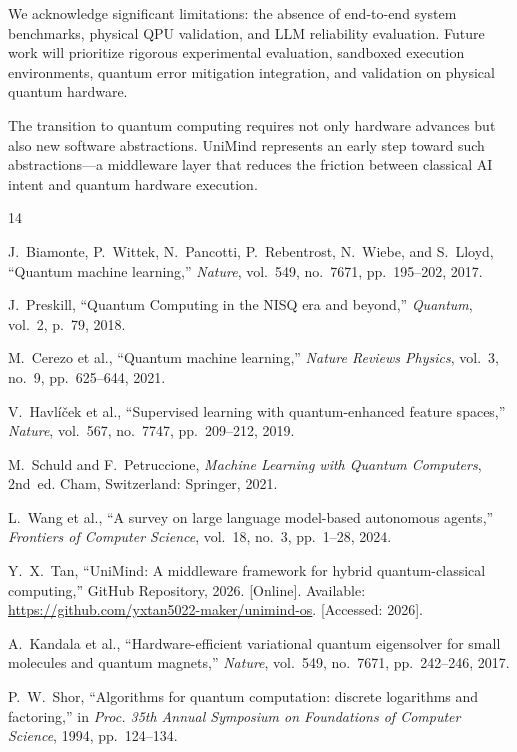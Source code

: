 ﻿\documentclass[12pt,a4paper]{article}
\begin{document}
We acknowledge significant limitations: the absence of end-to-end system benchmarks, physical QPU validation, and LLM reliability evaluation. Future work will prioritize rigorous experimental evaluation, sandboxed execution environments, quantum error mitigation integration, and validation on physical quantum hardware.

The transition to quantum computing requires not only hardware advances but also new software abstractions. UniMind represents an early step toward such abstractions---a middleware layer that reduces the friction between classical AI intent and quantum hardware execution.


\newpage
\begin{thebibliography}{14}

J.~Biamonte, P.~Wittek, N.~Pancotti, P.~Rebentrost, N.~Wiebe, and S.~Lloyd,
``Quantum machine learning,''
\textit{Nature}, vol.~549, no.~7671, pp.~195--202, 2017.

J.~Preskill,
``Quantum Computing in the NISQ era and beyond,''
\textit{Quantum}, vol.~2, p.~79, 2018.

M.~Cerezo et al.,
``Quantum machine learning,''
\textit{Nature Reviews Physics}, vol.~3, no.~9, pp.~625--644, 2021.

V.~Havl\'{i}\v{c}ek et al.,
``Supervised learning with quantum-enhanced feature spaces,''
\textit{Nature}, vol.~567, no.~7747, pp.~209--212, 2019.

M.~Schuld and F.~Petruccione,
\textit{Machine Learning with Quantum Computers}, 2nd~ed.
Cham, Switzerland: Springer, 2021.

L.~Wang et al.,
``A survey on large language model-based autonomous agents,''
\textit{Frontiers of Computer Science}, vol.~18, no.~3, pp.~1--28, 2024.

Y.~X.~Tan,
``UniMind: A middleware framework for hybrid quantum-classical computing,''
GitHub Repository, 2026.
[Online]. Available: \url{https://github.com/yxtan5022-maker/unimind-os}.
[Accessed: 2026].

A.~Kandala et al.,
``Hardware-efficient variational quantum eigensolver for small molecules and quantum magnets,''
\textit{Nature}, vol.~549, no.~7671, pp.~242--246, 2017.

P.~W.~Shor,
``Algorithms for quantum computation: discrete logarithms and factoring,''
in \textit{Proc. 35th Annual Symposium on Foundations of Computer Science},
1994, pp.~124--134.


\end{thebibliography}
\end{document}
